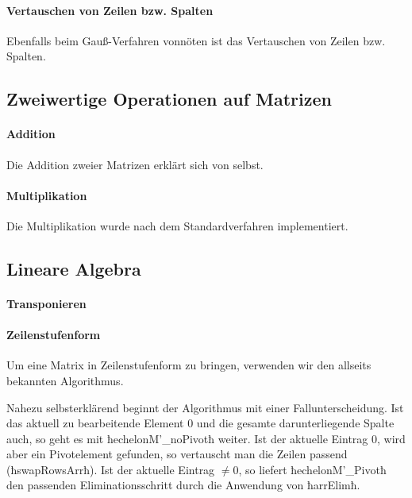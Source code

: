 \paragraph{Vertauschen von Zeilen bzw. Spalten} Ebenfalls beim Gauß-Verfahren
vonnöten ist das Vertauschen von Zeilen bzw. Spalten.



\subsection{Zweiwertige Operationen auf Matrizen}

\paragraph{Addition} Die Addition zweier Matrizen erklärt sich von selbst.


\paragraph{Multiplikation} Die Multiplikation wurde nach dem Standardverfahren
implementiert.


\subsection{Lineare Algebra}

\paragraph{Transponieren} \makebox{}


\paragraph{Zeilenstufenform} 
Um eine Matrix in Zeilenstufenform zu bringen, verwenden wir den allseits
bekannten Algorithmus.


Nahezu selbsterklärend beginnt der Algorithmus mit einer Fallunterscheidung.
Ist das aktuell zu bearbeitende Element $0$ und die gesamte darunterliegende
Spalte auch, so geht es mit ħechelonM'_noPivotħ weiter. Ist der aktuelle 
Eintrag $0$, wird aber ein Pivotelement gefunden, so vertauscht man die Zeilen
passend (ħswapRowsArrħ). Ist der aktuelle Eintrag $\neq 0$, so liefert 
ħechelonM'_Pivotħ den passenden Eliminationsschritt durch die Anwendung von
ħarrElimħ.


